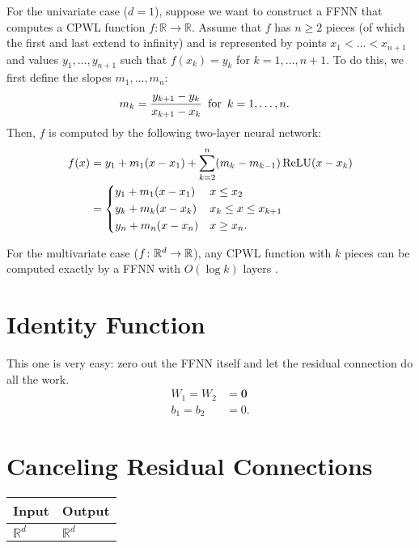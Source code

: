 For the univariate case ($d=1$), suppose we want to construct a FFNN that computes a CPWL function \(f \colon \mathbb{R} \to \mathbb{R}\). Assume that $f$ has $n \ge 2$ pieces (of which the first and last extend to infinity) and is represented by points \(x_1 < \ldots < x_{n+1}\) and values \(y_1, \ldots, y_{n+1}\) such that \(f(x_k) = y_k\) for \(k = 1, \ldots, n+1\).
To do this, we first define the slopes \(m_1, \ldots, m_n\):
\begin{align*}
  m_k &= \frac{y_{k+1} - y_{k}}{x_{k+1} - x_{k}} \enskip \text{for} \enskip k = 1, \ldots, n.
\end{align*}
Then, \(f\) is computed by the following two-layer neural network:
\begin{align*}
    f(x) &= y_1 + m_1 (x-x_1) + \sum_{k=2}^{n} (m_k - m_{k-1}) \, \text{ReLU}(x - x_k) \\
    &= \begin{dcases}
        y_1 + m_1 (x - x_1) &x \leq x_2 \\
        y_k + m_{k} (x - x_k) & x_k \leq x \leq x_{k+1} \\
        y_n + m_n (x - x_n) & x \geq x_n.
    \end{dcases}
\end{align*}

For the multivariate case ($f \colon \mathbb{R}^d \to \mathbb{R}$), any CPWL function with $k$ pieces can be computed exactly by a FFNN with $O(\log k)$ layers \citep{arora+:2018}.

\section{Identity Function}\label{sec:ffnn_identity}

This one is very easy: zero out the FFNN itself and let the residual connection do all the work.
\begin{align*}
W_1 = W_2 &= \mathbf{0} \\
b_1 = b_2 &= 0.
\end{align*}

\section{Canceling Residual Connections}\label{sec:ffnn_cancel_residual}

    \begin{tabular}{|p{1.5cm}|p{1.5cm}|}
        \hline
        \rowcolor{orange!20} %
        \textbf{Input} & \textbf{Output} \\
        \hline
        $\mathbb{R}^d$ & $\mathbb{R}^d$ \\
        \hline
    \end{tabular}

